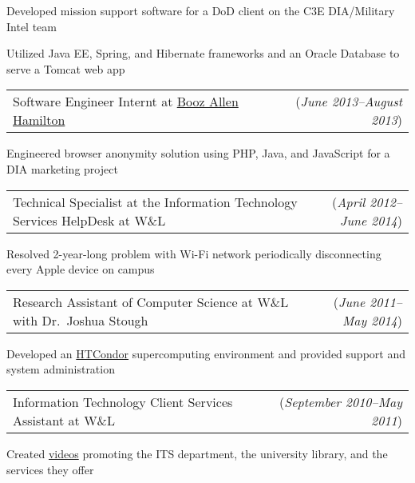 \documentclass[11pt, letterpaper]{letter}
\makeatletter
\newlength{\indwidth}            \setlength{\indwidth}{\textwidth-.4in}
\newcommand{\dated}[2]{
    \begin{tabular*}{\indwidth}{l@{\extracolsep{\fill}}r}
        #1 & (\textit{#2})
    \end{tabular*}
}
\newcommand{\datedTwo}[3]{
    \begin{tabular*}{\indwidth}{l@{\extracolsep{\fill}}r}
        #1 & (\textit{#2}) (\textit{#3})
    \end{tabular*}
}
\newcommand{\BAH}{\href{https://www.boozallen.com/}{Booz Allen Hamilton}}
\newcommand{\HTCondor}{\href{https://htcondor.org/}{HTCondor}}
\makeatother
\begin{document}
\begin{compactitem}
        \begin{compactitem}
            \item Developed mission support software for a DoD client on the C3E DIA/Military Intel team
            \item Utilized Java EE, Spring, and Hibernate frameworks and an Oracle Database to serve a Tomcat web app
        \end{compactitem}
    \item \dated{Software Engineer Internt at \BAH}{June 2013--August 2013}
        \begin{compactitem}
            \item Engineered browser anonymity solution using PHP, Java, and JavaScript for a DIA marketing project
        \end{compactitem}
    \item \dated{Technical Specialist at the Information Technology Services HelpDesk at W\&L}{April 2012--June 2014}
        \begin{compactitem}
        \item Resolved 2-year-long problem with Wi-Fi network periodically disconnecting every Apple device on campus
        \end{compactitem}
    \item \dated{Research Assistant of Computer Science at W\&L with Dr.\ Joshua Stough}{June 2011--May 2014}
        \begin{compactitem}
        \item Developed an \HTCondor{} supercomputing environment and provided support and system administration
        \end{compactitem}
    \item \dated{Information Technology Client Services Assistant at W\&L}{September 2010--May 2011}
        \begin{compactitem}
        \item Created \href{https://youtu.be/NvOarFOmly0}{videos} promoting the ITS department, the  university library,
            and the services they offer
        \end{compactitem}
    \iftoggle{smithbros}{%
        \item \datedTwo{%
                File Digitizer at Smith Brothers Abstract and Title Co.
            }{June 2009--August 2009}{June 2010--August 2010}
    }{}
\end{compactitem}
\end{document}
